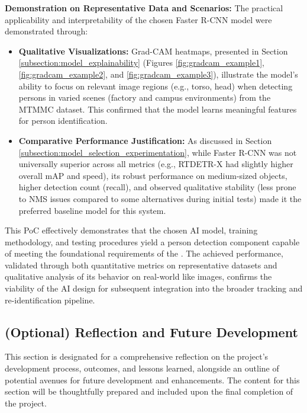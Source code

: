 \textbf{Demonstration on Representative Data and Scenarios:}
The practical applicability and interpretability of the chosen Faster R-CNN model were demonstrated through:
\begin{itemize}
    \item \textbf{Qualitative Visualizations:} Grad-CAM heatmaps, presented in Section \ref{subsection:model_explainability} (Figures \ref{fig:gradcam_example1}, \ref{fig:gradcam_example2}, and \ref{fig:gradcam_example3}), illustrate the model's ability to focus on relevant image regions (e.g., torso, head) when detecting persons in varied scenes (factory and campus environments) from the MTMMC dataset. This confirmed that the model learns meaningful features for person identification.
    \item \textbf{Comparative Performance Justification:} As discussed in Section \ref{subsection:model_selection_experimentation}, while Faster R-CNN was not universally superior across all metrics (e.g., RTDETR-X had slightly higher overall mAP and speed), its robust performance on medium-sized objects, higher detection count (recall), and observed qualitative stability (less prone to NMS issues compared to some alternatives during initial tests) made it the preferred baseline model for this system.
\end{itemize}
This PoC effectively demonstrates that the chosen AI model, training methodology, and testing procedures yield a person detection component capable of meeting the foundational requirements of the \usevar{\srsTitle}. The achieved performance, validated through both quantitative metrics on representative datasets and qualitative analysis of its behavior on real-world like images, confirms the viability of the AI design for subsequent integration into the broader tracking and re-identification pipeline.


\subsection{(Optional) Reflection and Future Development}
\label{section:reflection} %
This section is designated for a comprehensive reflection on the project's development process, outcomes, and lessons learned, alongside an outline of potential avenues for future development and enhancements. The content for this section will be thoughtfully prepared and included upon the final completion of the project.